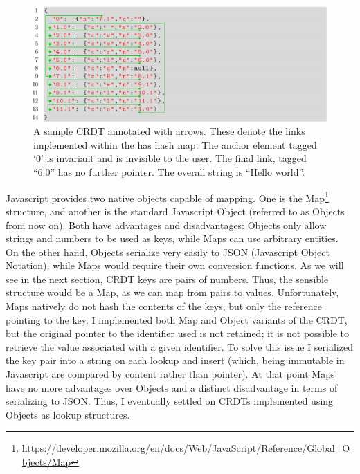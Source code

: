 \documentclass[12pt,a4paper,twoside,openright]{report}
\begin{document}
		
		


	\begin{figure}[H]
		\centering
		\includegraphics[width=1\linewidth]{figs/hash_list.eps}
		\caption[Annotated CRDT]{A sample CRDT annotated with arrows. These denote the links implemented within the has hash map. The anchor element tagged `0' is invariant and is invisible to the user. The final link, tagged ``6.0'' has no further pointer. The overall string is ``Hello world''.}
		\label{fig:hashlist}
		\end{figure}
		
		Javascript provides two native objects capable of mapping. One is the Map\footnote{\url{https://developer.mozilla.org/en/docs/Web/JavaScript/Reference/Global_Objects/Map}} structure, and another is the standard Javascript Object (referred to as Objects from now on). Both have advantages and disadvantages: Objects only allow strings and numbers to be used as keys, while Maps can use arbitrary entities. On the other hand, Objects serialize very easily to JSON (Javascript Object Notation), while Maps would require their own conversion functions. As we will see in the next section, CRDT keys are pairs of numbers. Thus, the sensible structure would be a Map, as we can map from pairs to values. Unfortunately, Maps natively do not hash the contents of the keys, but only the reference pointing to the key. I implemented both Map and Object variants of the CRDT, but the original pointer to the identifier used is not retained; it is not possible to retrieve the value associated with a given identifier. To solve this issue I serialized the key pair into a string on each lookup and insert (which, being immutable in Javascript are compared by content rather than pointer). At that point Maps have no more advantages over Objects and a distinct disadvantage in terms of serializing to JSON. Thus, I eventually settled on CRDTs implemented using Objects as lookup structures.
		
\end{document}
